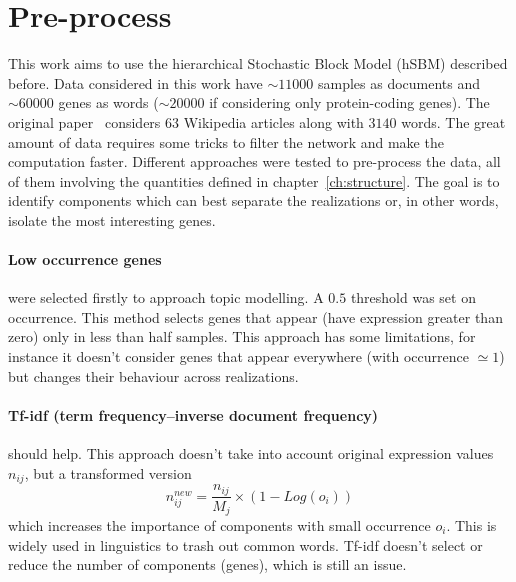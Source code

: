 \section{Pre-process}
This work aims to use the hierarchical Stochastic Block Model (hSBM) described before. Data considered in this work have $\sim 11000$ samples as documents and $\sim 60000$ genes as words ($\sim 20000$ if considering only protein-coding genes). The original paper~\cite{gerlach2018network} considers $63$ Wikipedia articles along with $3140$ words. The great amount of data requires some tricks to filter the network and make the computation faster.
Different approaches were tested to pre-process the data, all of them involving the quantities defined in chapter~\ref{ch:structure}. The goal is to identify components which can best separate the realizations or, in other words, isolate the most interesting genes.
 
\paragraph{Low occurrence genes} were selected firstly to approach topic modelling. A $0.5$ threshold was set on occurrence. This method selects genes that appear (have expression greater than zero) only in less than half samples. This approach has some limitations, for instance it doesn't consider genes that appear everywhere (with occurrence $\simeq 1$) but changes their behaviour across realizations.

\paragraph{Tf-idf (term frequency–inverse document frequency)} should help. This approach doesn't take into account original expression values $n_{ij}$, but a transformed version
\[
n^{new}_{ij}=\frac{n_{i j}}{M_j}\times \left(1-Log\left(o_i\right)\right)
\] which increases the importance of components with small occurrence $o_i$. This is widely used in linguistics to trash out common words. Tf-idf doesn't select or reduce the number of components (genes), which is still an issue.


